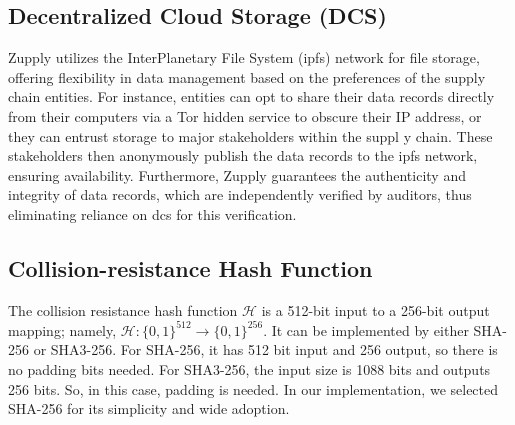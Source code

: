 \subsection{Decentralized Cloud Storage (DCS)}

Zupply utilizes the 
InterPlanetary File System
(\gls{ipfs}) network \cite{Benet2014} for file storage, offering flexibility in data management based on the preferences of the supply chain entities. For instance, entities can opt to share their data records directly from their computers via a Tor hidden service \cite{Loshin2013PracticalAnonymity} to obscure their IP address, or they can entrust storage to major stakeholders within the suppl 	y chain. These stakeholders then anonymously publish the data records to the \gls{ipfs} network, ensuring availability. Furthermore, Zupply guarantees the authenticity and integrity of data records, which are independently verified by auditors, thus eliminating reliance on \gls{dcs} for this verification. 




 



\subsection{Collision-resistance Hash Function}

The collision resistance hash function $\mathcal{H}$ is a 512-bit input to a 256-bit output mapping; namely, $\mathcal{H}:\{0,1\}^{512} \rightarrow \{0,1\}^{256}$. It can be implemented by either SHA-256 or SHA3-256. For SHA-256, it has 512 bit input and 256 output, so there is no padding bits needed. For SHA3-256, the input size is 1088 bits  and outputs 256 bits. So, in this case, padding is needed. In our implementation, we selected SHA-256 for its simplicity and wide adoption.  

